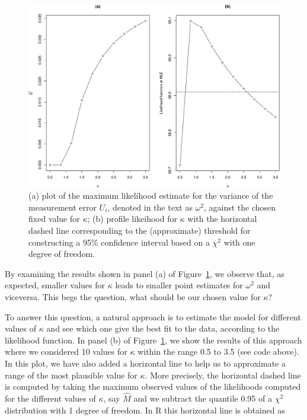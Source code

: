 \documentclass[
  letterpaper,
]{krantz}
\begin{document}
\begin{figure}

{\centering \includegraphics[width=8.5in,height=\textheight]{03_model-fitting_files/figure-pdf/fig-galicia-matern-1.pdf}

}

\caption{\label{fig-galicia-matern}(a) plot of the maximum likelihood
estimate for the variance of the measurement error \(U_i\), denoted in
the text as \(\omega^2\), against the chosen fixed value for \(\kappa\);
(b) profile likeihood for \(\kappa\) with the horizontal dashed line
corresponding to the (approximate) threshold for constructing a 95\%
confidence interval based on a \(\chi^2\) with one degree of freedom.}

\end{figure}

By examining the results shown in panel (a) of
Figure~\ref{fig-galicia-matern}, we observe that, as expected, smaller
values for \(\kappa\) leads to smaller point estimates for \(\omega^2\)
and viceversa. This begs the question, what should be our chosen value
for \(\kappa\)?

To answer this question, a natural approach is to estimate the model for
different values of \(\kappa\) and see which one give the best fit to
the data, according to the likelihood function. In panel (b) of
Figure~\ref{fig-galicia-matern}, we show the results of this approach
where we considered 10 values for \(\kappa\) within the range 0.5 to 3.5
(see code above). In this plot, we have also added a horizontal line to
help us to approximate a range of the most plausible value for
\(\kappa\). More precisely, the horizontal dashed line is computed by
taking the maximum observed values of the likelihoods computed for the
different values of \(\kappa\), say \(\hat{M}\) and we subtract the
quantile 0.95 of a \(\chi^2\) distribution with 1 degree of freedom. In
R this horizontal line is obtained as
\end{document}

